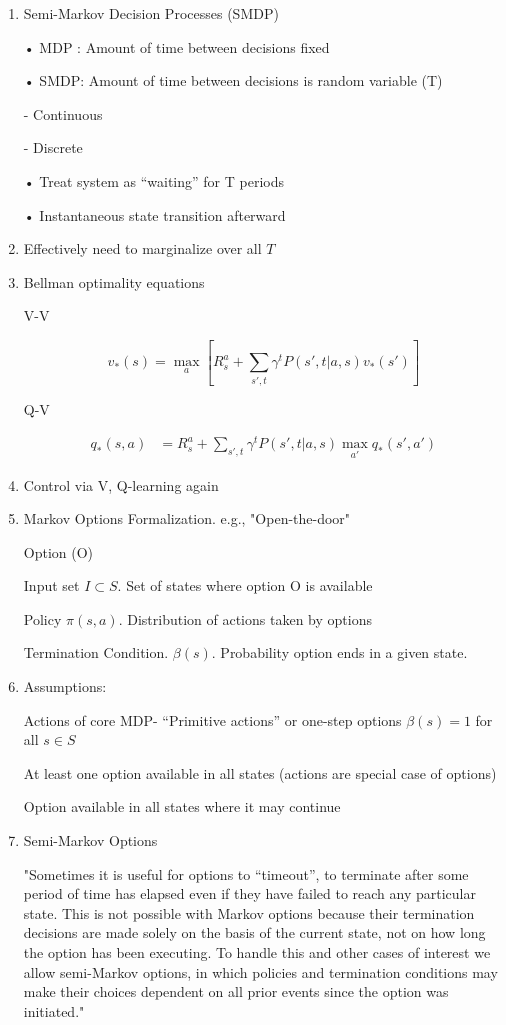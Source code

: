 \documentclass[english]{article}
\begin{document}
\begin{enumerate}
\item 
Semi-Markov Decision Processes (SMDP)

• MDP : Amount of time
between decisions fixed

• SMDP: Amount of time
between decisions is random
variable (T)


- Continuous

- Discrete

• Treat system as “waiting” for
T periods

• Instantaneous state transition
afterward
\item Effectively need to marginalize over all $T$

\item Bellman optimality equations

V-V

$$v_*(s) 
= \max_{a} 
[R_s^a +\sum_{s',t} \gamma^t 
P(s',t|a,s) v_*(s')]$$


Q-V

\begin{align*}
q_*(s,a) &= R_s^a
+
\sum_{s',t} \gamma^t 
P(s',t|a,s) \max_{a'} q_*(s',a')
\end{align*}


\item Control via V, Q-learning again

\item Markov Options Formalization. e.g., "Open-the-door"

Option (O)

Input set $I \subset S$. Set of states where
option O is available

Policy $\pi(s,a)$. Distribution of actions taken by options

Termination
Condition. $\beta(s)$. Probability option ends in a given state.

\item Assumptions: 

Actions of core MDP- “Primitive actions” or one-step
options $\beta(s) = 1$  for all $s \in S$

At least one option available
in all states (actions are special case of options)

Option available in all states
where it may continue 

\item Semi-Markov Options 

"Sometimes it is useful for options to “timeout”, to terminate after some period of time
has elapsed even if they have failed to reach any particular state. This is not possible
with Markov options because their termination decisions are made solely on the basis
of the current state, not on how long the option has been executing. To handle this and
other cases of interest we allow semi-Markov options, in which policies and termination
conditions may make their choices dependent on all prior events since the option was
initiated."



\end{enumerate}
\end{document}
